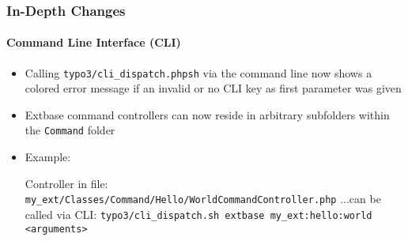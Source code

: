 \begin{frame}[fragile]
	\frametitle{In-Depth Changes}
	\framesubtitle{Command Line Interface (CLI)}

	\lstset{basicstyle=\tiny\ttfamily}

	\begin{itemize}

		\item Calling \texttt{typo3/cli\_dispatch.phpsh} via the command line now shows a
			colored error message if an invalid or no CLI key as first parameter was given

		\item Extbase command controllers can now reside in arbitrary subfolders within the
			\texttt{Command} folder

		\item Example:\newline

			Controller in file:\newline
			\smaller\texttt{my\_ext/Classes/Command/Hello/WorldCommandController.php}\normalsize\newline
			...can be called via CLI:\newline
			\smaller\texttt{typo3/cli\_dispatch.sh extbase my\_ext:hello:world <arguments>}\normalsize

	\end{itemize}

\end{frame}


